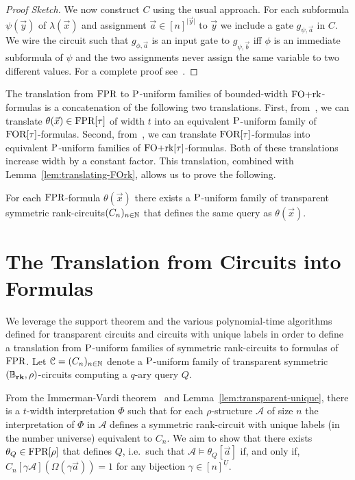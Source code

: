 \documentclass[a4paper,UKenglish]{lipics-v2018}
\begin{document}
\begin{proof}[Proof Sketch]
  We now construct $C$ using the usual approach. For each subformula
  $\psi(\vec{y})$ of $\lambda(\vec{x})$ and assignment $\vec{a} \in [n]^{\vert
    \vec{y} \vert}$ to $\vec{y}$ we include a gate $g_{\psi, \vec{a}}$ in $C$.
  We wire the circuit such that $g_{\phi, \vec{a}}$ is an input gate to
  $g_{\psi, \vec{b}}$ iff $\phi$ is an immediate subformula of $\psi$ and the
  two assignments never assign the same variable to two different values. For a
  complete proof see~\cite{DW-arxiv}.
\end{proof}

The translation from $\text{\upshape FPR}$ to $\mathrm{P}$-uniform families of bounded-width
$\text{\upshape FO+rk}$-formulas is a concatenation of the following two translations. First,
from~\cite{Dawar09logicswith}, we can translate $\theta(\vec{x}) \in \text{\upshape FPR}[\tau]$
of width $t$ into an equivalent $\mathrm{P}$-uniform family of $\text{\upshape FOR}[\tau]$-formulas.
Second, from~\cite{libkin2004elements}, we can translate $\text{\upshape FOR}[\tau]$-formulas
into equivalent $\mathrm{P}$-uniform families of $\text{\upshape FO+rk}[\tau]$-formulas. Both of these
translations increase width by a constant factor. This translation, combined
with Lemma~\ref{lem:translating-FOrk}, allows us to prove the following.

\begin{theorem}
  For each $\text{\upshape FPR}$-formula $\theta(\vec{x})$ there exists a $\mathrm{P}$-uniform family
  of transparent symmetric rank-circuits$(C_n)_{n \in \mathbb{N}}$ that defines the
  same query as $\theta(\vec{x})$.
  \label{thm:translating-formulas-to-circuits}
\end{theorem}

\section{The Translation from Circuits into
  Formulas}\label{sec:circuits-to-formulas}
We leverage the support theorem and the various polynomial-time algorithms
defined for transparent circuits and circuits with unique labels in order to
define a translation from $\mathrm{P}$-uniform families of symmetric rank-circuits to
formulas of $\text{\upshape FPR}$. Let $\mathcal{C} = (C_n)_{n \in \mathbb{N}}$ denote a
$\mathrm{P}$-uniform family of transparent symmetric $(\mathbb{B}_{\text{\textbf{rk}}}, \rho)$-circuits computing a
$q$-ary query $Q$.

From the Immerman-Vardi theorem~\cite{Immerman198686, Vardi:1982} and
Lemma~\ref{lem:transparent-unique}, there is a $t$-width interpretation $\Phi$
such that for each $\rho$-structure $\mathcal{A}$ of size $n$ the interpretation
of $\Phi$ in $\mathcal{A}$ defines a symmetric rank-circuit with unique labels
(in the number universe) equivalent to $C_n$. We aim to show that there exists
$\theta_Q \in \text{\upshape FPR}[\rho]$ that defines $Q$, i.e.\ such that $\mathcal{A} \models
\theta_Q[\vec{a}]$ if, and only if, $C_n[\gamma \mathcal{A}](\Omega (\gamma
\vec{a})) = 1$ for any bijection $\gamma \in [n]^{\underline{U}}$.
\end{document}
